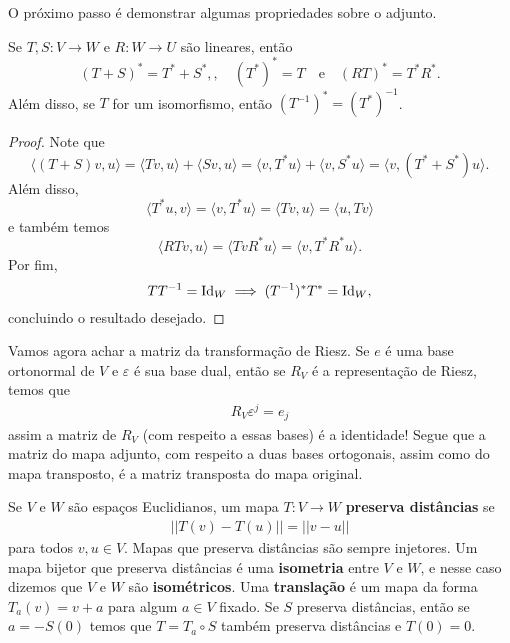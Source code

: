 O próximo passo é demonstrar algumas propriedades sobre o adjunto.

\begin{proposition}
    Se $T, S \colon V \to W$ e $R \colon W \to U$ são lineares, então \begin{equation}
        (T + S)^* = T^* + S^*,, \quad (T^*)^* = T \quad \text{e} \quad (RT)^* = T^* R^*.
    \end{equation} Além disso, se $T$ for um isomorfismo, então $(T^{-1})^* = (T^*)^{-1}$.
\end{proposition}
\begin{proof}
    Note que \begin{equation}
        \langle (T+S)v, u \rangle = \langle Tv, u \rangle + \langle Sv, u \rangle = \langle v, T^*u \rangle + \langle v, S^*u \rangle = \langle v, (T^* + S^*)u \rangle.
    \end{equation} Além disso, \begin{equation}
        \langle T^*u, v \rangle = \langle v, T^*u \rangle = \langle Tv, u \rangle = \langle u, Tv \rangle
    \end{equation} e também temos \begin{equation}
        \langle RTv, u \rangle = \langle Tv R^*u \rangle = \langle v, T^*R^*u \rangle.
    \end{equation} Por fim, \begin{equation}
        TT^{-1} = \operatorname{Id}_W \implies (T^{-1})^*T^* = \operatorname{Id}_W,
    \end{equation} concluindo o resultado desejado.
\end{proof}

Vamos agora achar a matriz da transformação de Riesz. Se $e$ é uma base ortonormal de $V$ e $\varepsilon$ é sua base dual, então se $R_V$ é a representação de Riesz, temos que \begin{eqnarray}
    R_V\varepsilon^j =  e_j
\end{eqnarray} assim a matriz de $R_V$ (com respeito a essas bases) é a identidade! Segue que a matriz do mapa adjunto, com respeito a duas bases ortogonais, assim como do mapa transposto, é a matriz transposta do mapa original.

Se $V$ e $W$ são espaços Euclidianos, um mapa $T \colon V \to W$ \textbf{preserva distâncias} se \begin{eqnarray}
    ||T(v) - T(u)|| = ||v - u||
\end{eqnarray} para todos $v, u \in V$. Mapas que preserva distâncias são sempre injetores. Um mapa bijetor que preserva distâncias é uma \textbf{isometria} entre $V$ e $W$, e nesse caso dizemos que $V$ e $W$ são \textbf{isométricos}. Uma \textbf{translação} é um mapa da forma $T_a(v) = v + a$ para algum $a \in V$ fixado. Se $S$ preserva distâncias, então se $a = -S(0)$ temos que $T = T_a \circ S$ também preserva distâncias e $T(0) = 0$.

